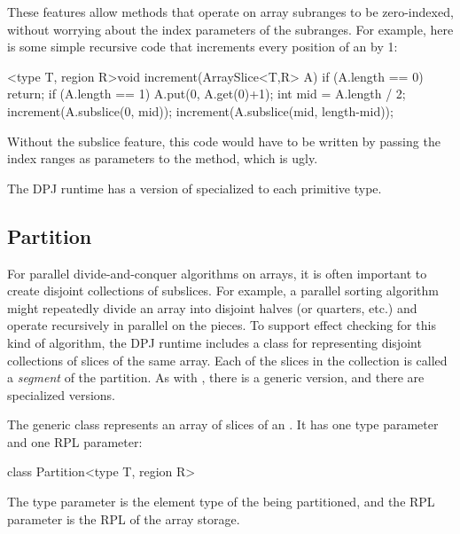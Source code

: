 These features allow methods that operate on array subranges to be
zero-indexed, without worrying about the index parameters of the
subranges.  For example, here is some simple recursive code that
increments every position of an  by 1:
%
\begin{dpjlisting}
<type T, region R>void increment(ArraySlice<T,R> A) {
  if (A.length == 0) return;
  if (A.length == 1) {
    A.put(0, A.get(0)+1);
  }
  int mid = A.length / 2;
  increment(A.subslice(0, mid));
  increment(A.subslice(mid, length-mid));
}
\end{dpjlisting}
%
Without the subslice feature, this code would have to be written by
passing the index ranges as parameters to the  method,
which is ugly.

 The DPJ runtime has a version of
 specialized to each primitive type.

\subsection{Partition%
\label{sec:runtime:partition}}

For parallel divide-and-conquer algorithms on arrays, it is often
important to create disjoint collections of subslices.  For example, a
parallel sorting algorithm might repeatedly divide an array into
disjoint halves (or quarters, etc.) and operate recursively in
parallel on the pieces.  To support effect checking for this kind of
algorithm, the DPJ runtime includes a class  for
representing disjoint collections of slices of the same array.  Each
of the slices in the collection is called a \emph{segment} of the
partition.  As with , there is a generic version, and
there are specialized versions.

  The generic 
class represents an array of slices of an .  It has
one type parameter and one RPL parameter:
%
\begin{dpjlisting}
class Partition<type T, region R>
\end{dpjlisting}
%
The type parameter is the element type of the  being
partitioned, and the RPL parameter is the RPL of the array storage.

